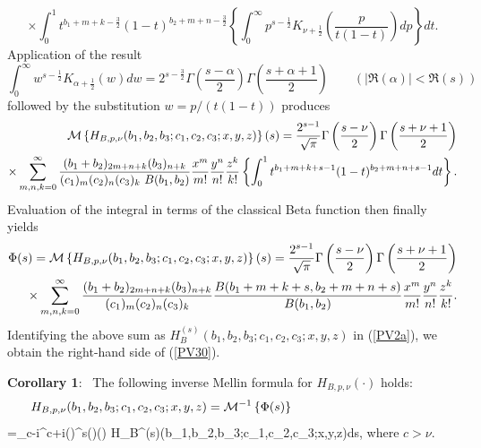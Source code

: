 \[\times\int_{0}^{1}t^{b_{1}+m+k-\frac{3}{2}}(1-t)^{b_{2}+m+n-\frac{3}{2}} \left\{\int_{0}^{\infty}p^{s-\frac{1}{2}}K_{\nu+\frac{1}{2}}\left(\frac{p}{t(1-t)}\right)dp\right\}dt.\]
Application of the result \cite[(10.43.19)]{AB26}
\[\int_{0}^{\infty}w^{s-\frac{1}{2}}K_{\alpha+\frac{1}{2}}(w)dw=2^{s-\frac{3}{2}}\Gamma\left(\frac{s-\alpha}{2}\right)
\Gamma\left(\frac{s+\alpha+1}{2}\right)\qquad (|\Re (\alpha)|<\Re (s))\]
followed by the substitution $w=p/(t(1-t))$ produces
\begin{eqnarray*}\label{PV34}
{\cal M}\left\{H_{B,p,\nu}(b_{1},b_{2},b_{3};c_{1},c_{2},c_{3};x,y,z)\right\}(s)
=\frac{2^{s-1}}{\sqrt{\pi}}\Gamma\left(\frac{s-\nu}{2}\right)\Gamma\left(\frac{s+\nu+1}{2}\right)
\nonumber\\ \times\sum_{m,n,k=0}^{\infty}\frac{(b_{1}+b_{2})_{2m+n+k}(b_{3})_{n+k}}{(c_{1})_{m}(c_{2})_{n}(c_{3})_{k}~B(b_{1},b_{2})}\frac{x^{m}}{m!}\frac{y^{n}}{n!}\frac{z^{k}}{k!}
\left\{\int_{0}^{1}t^{b_{1}+m+k+s-1}(1-t)^{b_{2}+m+n+s-1}dt\right\}.
\end{eqnarray*}
Evaluation of the integral in terms of the classical Beta function then finally yields
\begin{eqnarray*}\label{PV35}
\Phi(s)={\cal M}\left\{H_{B,p,\nu}(b_{1},b_{2},b_{3};c_{1},c_{2},c_{3};x,y,z)\right\}(s)
=\frac{2^{s-1}}{\sqrt{\pi}}\Gamma\left(\frac{s-\nu}{2}\right)\Gamma\left(\frac{s+\nu+1}{2}\right)\\  \times\sum_{m,n,k=0}^{\infty}\frac{(b_{1}+b_{2})_{2m+n+k}(b_{3})_{n+k}}{(c_{1})_{m}(c_{2})_{n}(c_{3})_{k}}
\frac{B(b_{1}+m+k+s,b_{2}+m+n+s)}{B(b_{1},b_{2})}\frac{x^{m}}{m!}\frac{y^{n}}{n!}\frac{z^{k}}{k!}.
\end{eqnarray*}
Identifying the above sum as $H_B^{(s)}(b_{1},b_{2},b_{3};c_{1},c_{2},c_{3};x,y,z)$ in (\ref{PV2a}), we obtain the right-hand side of (\ref{PV30}).


\bigskip

\noindent
\textbf{Corollary 1}: \ The following inverse Mellin formula for $H_{B,p,\nu}(\cdot)$ holds:
\[H_{B,p,\nu}(b_{1},b_{2},b_{3};c_{1},c_{2},c_{3};x,y,z)={\cal M}^{-1}\left\{\Phi(s)\right\}\hspace{4cm}\]
\bee\label{PV36}
=\int_{c-i\infty}^{c+i\infty}\left(\right)^{s}\Gamma\left(\right)\Gamma\left(\right)
H_{B}^{(s)}\left(b_{1},b_{2},b_{3};c_{1},c_{2},c_{3};x,y,z\right)ds,
\ee
where $c>\nu$.
\vspace{0.6cm}

